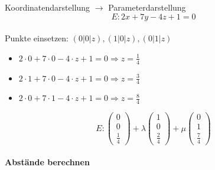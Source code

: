 \begin{example2}{Koordinatendarstellung $\rightarrow$ Parameterdarstellung}
    $$E: 2x + 7y - 4z + 1 = 0$$\\
    Punkte einsetzen: $(0|0|z), (1|0|z), (0|1|z)$\\
    \begin{minipage}{0.5\linewidth}
    \begin{itemize}
        \item $2 \cdot 0 + 7 \cdot 0 - 4 \cdot z + 1 = 0 \Rightarrow z = \frac{1}{4}$
        \item $2 \cdot 1 + 7 \cdot 0 - 4 \cdot z + 1 = 0 \Rightarrow z = \frac{3}{4}$
        \item $2 \cdot 0 + 7 \cdot 1 - 4 \cdot z + 1 = 0 \Rightarrow z = \frac{8}{4}$
    \end{itemize}
    \end{minipage}
    \begin{minipage}{0.5\linewidth}
    $$E: \begin{pmatrix} 0 \\ 0 \\ \frac{1}{4} \end{pmatrix} +
    \lambda \begin{pmatrix} 1 \\ 0 \\ \frac{2}{4} \end{pmatrix} +
    \mu \begin{pmatrix} 0 \\ 1 \\ \frac{7}{4} \end{pmatrix}$$
    \end{minipage}
\end{example2}



\paragraph*{Abstände berechnen}


